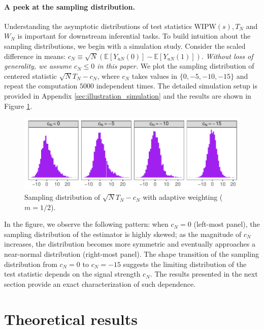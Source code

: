 \documentclass[12pt]{article}
\newcommand{\E}{\mathbb E}								%
\newcommand{\WIPW}{\mathrm{WIPW}}
\begin{document}
\paragraph{A peek at the sampling distribution.}

Understanding the asymptotic distributions of test statistics $\WIPW(s),T_N$ and $W_N$ is important for downstream inferential tasks. To build intuition about the sampling distributions, we begin with a simulation study. Consider the scaled difference in means: $c_N \equiv \sqrt{N}(\E[Y_{uN}(0)] - \E[Y_{uN}(1)])$. \textit{Without loss of generality, we assume \(c_N \leq 0\) in this paper.} We plot the sampling distribution of centered statistic \(\sqrt{N}T_N - c_N\), where $c_N$ takes values in \( \{0, -5, -10, -15\}\) and repeat the computation $5000$ independent times. 
The detailed simulation setup is provided in Appendix \ref{sec:illustration_simulation} and the results are shown in Figure \ref{fig:sampling_distribution}. 


\begin{figure}[!ht]
    \centering
    \includegraphics[width=.85\textwidth]{figures-and-tables/auxiliary/sampling_distribution.pdf}
    \caption{Sampling distribution of \(\sqrt{N} T_N - c_N\) with adaptive weighting (\(m = 1/2\)).}
    \label{fig:sampling_distribution}
\end{figure}

In the figure, we observe the following pattern: when \(c_N = 0\) (left-most panel), 
the sampling distribution of the estimator is highly skewed; 
as the magnitude of \(c_N\) increases, the distribution becomes more symmetric and eventually approaches a near-normal distribution (right-most panel). 
The shape transition of the sampling distribution from \(c_N = 0\) to \(c_N = -15\) suggests the limiting distribution of the test statistic depends on the signal strength \(c_N\). The results presented in the next section provide an exact characterization of such dependence.


\section{Theoretical results}\label{sec:weak_convergence_WIPW} 
\end{document}
